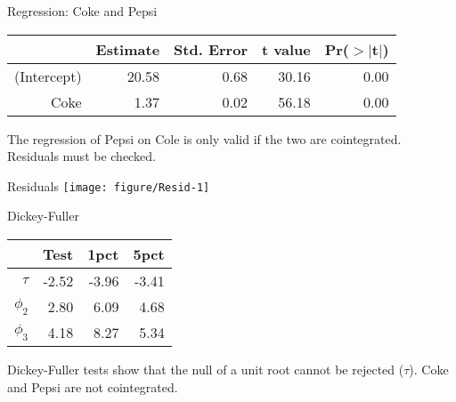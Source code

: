 \documentclass[14pt,xcolor=pdftex,dvipsnames,table]{beamer}\usepackage[]{graphicx}\usepackage[]{color}
\makeatletter
\def\maxwidth{ %
  \ifdim\Gin@nat@width>\linewidth
    \linewidth
  \else
    \Gin@nat@width
  \fi
}
\newenvironment{knitrout}{}{} %
\makeatother
\begin{document}
\begin{frame}{Regression: Coke and Pepsi}
\begin{table}[ht]
\centering
\begin{tabular}{rrrrr}
  \hline
 & Estimate & Std. Error & t value & Pr($>$$|$t$|$) \\ 
  \hline
(Intercept) & 20.58 & 0.68 & 30.16 & 0.00 \\ 
  Coke & 1.37 & 0.02 & 56.18 & 0.00 \\ 
   \hline
\end{tabular}
\end{table}

The regression of Pepsi on Cole is only valid if the two are cointegrated.  Residuals must be checked. 

\end{frame}

\begin{frame}{Residuals}
\begin{knitrout}
\color{fgcolor}
\texttt{[image: figure/Resid-1]} 

\end{knitrout}
\end{frame}

\begin{frame}{Dickey-Fuller}
\begin{table}[ht]
\centering
\begin{tabular}{rrrr}
  \hline
   & Test & 1pct& 5pct  \\ 
  \hline
$\tau$ & -2.52 & -3.96 & -3.41\\
 $\phi_2$ & 2.80 & 6.09 & 4.68\\ 
$\phi_3$ & 4.18 & 8.27 & 5.34\\ 
   \hline
\end{tabular}
\end{table}
Dickey-Fuller tests  show that the null of a unit root cannot be rejected ($\tau$).  Coke and Pepsi are not cointegrated. 
\end{frame}
\end{document}
